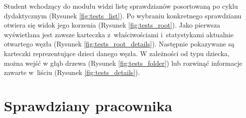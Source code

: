 \documentclass{pracamgr}
\begin{document}
Student wchodzący do modułu widzi listę sprawdzianów posortowaną po cyklu dydaktycznym (Rysunek \ref{fig:tests_list}).
Po wybraniu konkretnego sprawdzianu otwiera się widok jego korzenia (Rysunek \ref{fig:tests_root}). Jako pierwsza
wyświetlana jest zawsze karteczka z~właściwościami i~statystykami aktualnie otwartego
węzła (Rysunek \ref{fig:tests_root_details}). Następnie pokazywane są karteczki reprezentujące dzieci danego węzła.
W zależności od typu dziecka, można wejść w głąb drzewa (Rysunek \ref{fig:tests_folder}) lub rozwinąć informacje zawarte w~liściu (Rysunek \ref{fig:tests_details}).

\clearpage

\section{Sprawdziany pracownika}
\end{document}
